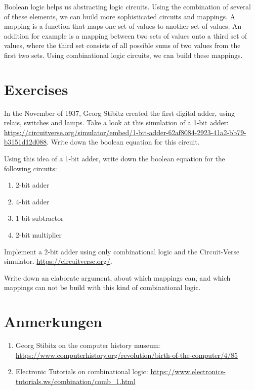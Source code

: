 \documentclass{dcbl/challenge}
\begin{document}
Boolean logic helps us abstracting logic circuits.
Using the combination of several of these elements, we can build more sophisticated circuits and mappings.
A mapping is a function that maps one set of values to another set of values.
An addition for example is a mapping between two sets of values onto a third set of values, where the third set consists of all possible sums of two values from the first two sets.
Using combinational logic circuits, we can build these mappings.


\section*{Exercises}
\begin{aufgabe}
    In the November of 1937, Georg Stibitz created the first digital adder, using relais, switches and lamps. Take a look at this simulation of a 1-bit adder: \url{https://circuitverse.org/simulator/embed/1-bit-adder-62af8084-2923-41a2-bb79-b3151d12d088}. 
    Write down the boolean equation for this circuit. 
\end{aufgabe}

\begin{aufgabe}
    Using this idea of a 1-bit adder, write down the boolean equation for the following circuits:
    \begin{enumerate}
        \item 2-bit adder
        \item 4-bit adder
        \item 1-bit subtractor
        \item 2-bit multiplier
    \end{enumerate}
\end{aufgabe}

\begin{aufgabe}
    Implement a 2-bit adder using only combinational logic and the Circuit-Verse simulator. \url{https://circuitverse.org/}.
\end{aufgabe}

\begin{aufgabe}
    Write down an elaborate argument, about which mappings can, and which mappings can not be build with this kind of combinational logic.
\end{aufgabe}

\section*{Anmerkungen}
\begin{enumerate}
    \item Georg Stibitz on the computer history museum: \url{https://www.computerhistory.org/revolution/birth-of-the-computer/4/85}
    \item Electronic Tutorials on combinational logic: \url{https://www.electronics-tutorials.ws/combination/comb_1.html}
\end{enumerate}
\end{document}
